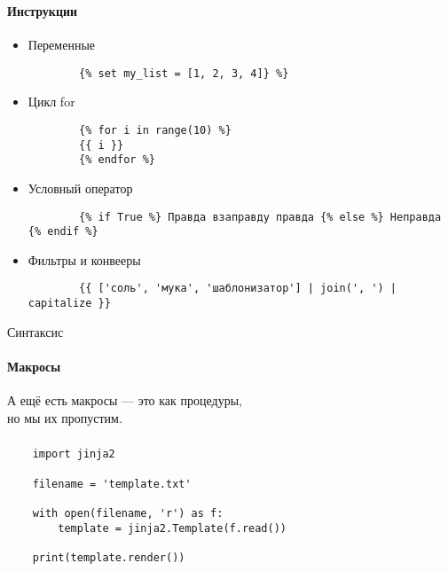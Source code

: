 \begin{frame}[fragile]
  \frametitle{\Insertsubsection}
  \framesubtitle{Инструкции}


  \begin{itemize}[<+-| @alert ->]
    \item Переменные\\
      \begin{verbatim}
        {% set my_list = [1, 2, 3, 4]} %}
      \end{verbatim}
    \item Цикл for
      \begin{verbatim}
        {% for i in range(10) %}
        {{ i }}
        {% endfor %}
      \end{verbatim}
    \item Условный оператор
      \begin{verbatim}
        {% if True %} Правда взаправду правда {% else %} Неправда {% endif %}
      \end{verbatim}
    \item Фильтры и конвееры
      \begin{verbatim}
        {{ ['соль', 'мука', 'шаблонизатор'] | join(', ') | capitalize }}
      \end{verbatim}
  \end{itemize}
\end{frame}

\begin{frame}{Синтаксис}
  \framesubtitle{Макросы}


  \centering
  \inlineicon{\faFire}
  А ещё есть макросы --- это как процедуры\pause,\\
  но мы их пропустим.
\end{frame}

\begin{frame}[t, fragile]
  \ExampleNote{}

  \frametitle{\Insertsubsection}
  \begin{verbatim}
    import jinja2

    filename = 'template.txt'

    with open(filename, 'r') as f:
        template = jinja2.Template(f.read())

    print(template.render())
  \end{verbatim}
\end{frame}

